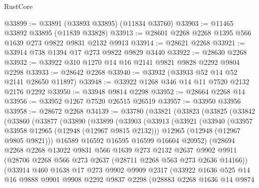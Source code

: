 \begin{lexlean}{RustCore}
\begin{coremodule}
@33899 := @33891 (@33893 @33895) (@11834 @33760)
@33903 := @11465 @33892 @33895 (@11839 @33828)
@33913 := @28601 @2268 @2268 @1395 @566 @1639 @273 @9822 @9831 @2132 @9913
@33914 := @28621 @2268
@33921 := @33914 @738 @1394 @17 @273 @9822 @9829 @3440
@33922 := @28630 @2268
@33932 := @33922 @310 @1270 @14 @16 @2141 @9821 @9828 @2292 @9804 @2298
@33933 := @28642 @2268
@33940 := @33932 (@33933 @52 @14 @52 @2141 @28650 @11897)
@33948 := @33922 @1268 @346 @14 @11 @7520 @2132 @2176 @2292
@33950 := @33948 @9814 @2298
@33952 := @28664 @2268 @14
@33956 := @33952 @1267 @7520 @26515 @26519
@33957 := @33950 @33956
@33958 := @28672 @2268
@34139 := @33780
    (@33821
      (@33823
        (@33825
          (@33842
            (@33860
              (@33877
                (@33890
                  (@33899
                    (@33903
                      (@33913
                        (@33921
                          (@33940
                            (@33957 @33958 @12965 (@12948 (@12967 @9815 @2132)))
                            @12965
                            (@12948 (@12967 @9805 @9821)))
                          @16589
                          @16592
                          @16595
                          @16599
                          @16604
                          @20952)
                        (@28694
                          @2268
                          @2268
                          @13022
                          @9831
                          @566
                          @1639
                          @273
                          @2132
                          @2637
                          @9902
                          @9911
                          (@28706 @2268 @566 @273 @2637 (@28711 @2268 @563 @273 @2636 @14166))
                          (@33914
                            @460
                            @1638
                            @17
                            @273
                            @9902
                            @9909
                            @2317
                            (@33922
                              @1636
                              @525
                              @14
                              @16
                              @9888
                              @9901
                              @9908
                              @2292
                              @9837
                              @2298
                              (@28883
                                @2268
                                @1636
                                @14
                                @9874

\end{coremodule}
\end{lexlean}
